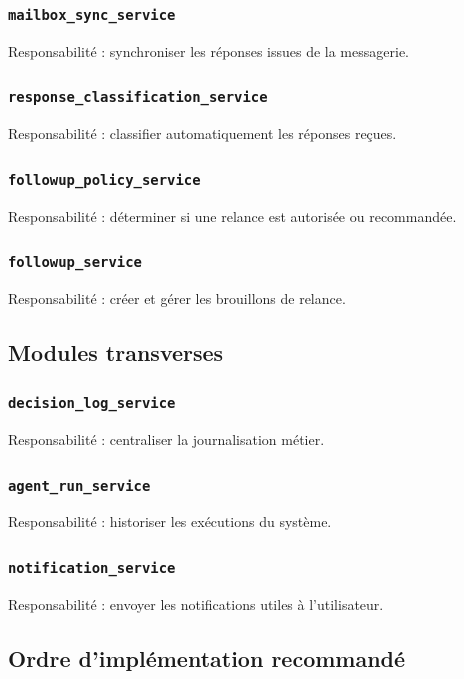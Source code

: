 \documentclass[11pt,a4paper]{article}
\begin{document}
\subsubsection{\texttt{mailbox\_sync\_service}}
Responsabilité : synchroniser les réponses issues de la messagerie.

\subsubsection{\texttt{response\_classification\_service}}
Responsabilité : classifier automatiquement les réponses reçues.

\subsubsection{\texttt{followup\_policy\_service}}
Responsabilité : déterminer si une relance est autorisée ou recommandée.

\subsubsection{\texttt{followup\_service}}
Responsabilité : créer et gérer les brouillons de relance.

\subsection{Modules transverses}

\subsubsection{\texttt{decision\_log\_service}}
Responsabilité : centraliser la journalisation métier.

\subsubsection{\texttt{agent\_run\_service}}
Responsabilité : historiser les exécutions du système.

\subsubsection{\texttt{notification\_service}}
Responsabilité : envoyer les notifications utiles à l’utilisateur.

\subsection{Ordre d’implémentation recommandé}
\end{document}
